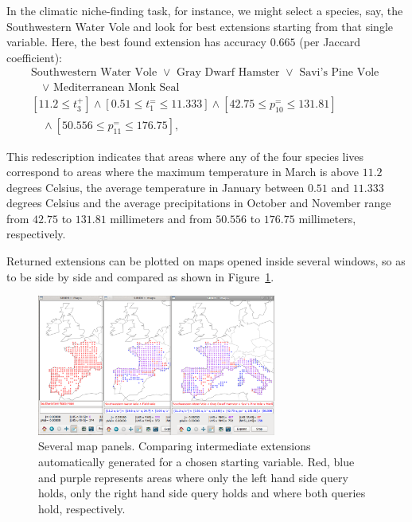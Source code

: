 In the climatic niche-finding task, for instance, we might select a
species, say, the Southwestern Water Vole and look for best extensions
starting from that single variable. Here, the best found extension has
accuracy $0.665$ (per Jaccard coefficient):
\begin{equation*}
\begin{array}{l}
\text{Southwestern Water Vole }\lor\text{ Gray Dwarf Hamster }\lor\text{ Savi's Pine Vole }\\[1mm]
\quad\lor\text{ Mediterranean Monk Seal}\\[3mm]
[11.2 \leq t_{3}^{+}] \land  [0.51 \leq t_{1}^{=} \leq 11.333]\land  [42.75 \leq p_{10}^{=} \leq 131.81] \\[1mm]
\quad\land [50.556 \leq p_{11}^{=} \leq 176.75],
\end{array}
\end{equation*}

This redescription indicates that areas where any of the four species
lives correspond to areas where the maximum temperature in March is
above $11.2$ degrees Celsius, the average temperature in January
between $0.51$ and $11.333$ degrees Celsius and the average
precipitations in October and November range from $42.75$ to $131.81$
millimeters and from $50.556$ to $176.75$ millimeters, respectively.

Returned extensions can be plotted on maps opened inside several
windows, so as to be  side by side and compared as shown in
Figure~\ref{fig:comparison}.

\begin{figure}
  \centering
\includegraphics[width=0.7\textwidth]{screenshots/comparison}
  \caption{Several map panels. Comparing intermediate extensions automatically generated for a chosen starting variable. Red, blue and purple represents areas where only the left hand side query holds, only the right hand side query holds and where both queries hold, respectively.}
  \label{fig:comparison}
\end{figure}


